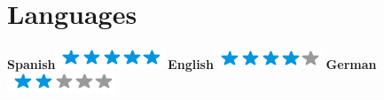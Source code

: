 \begin{aside}
    ~
    ~
    ~
    ~
    ~
    ~
    ~
    ~
    ~
    ~
    ~
    ~
    \section{Languages}
    \textbf{Spanish}\includegraphics[scale=0.40]{img/5stars.png}
    \textbf{English}\includegraphics[scale=0.40]{img/4stars.png}
    \textbf{German}\includegraphics[scale=0.40]{img/2stars.png}
\end{aside}

